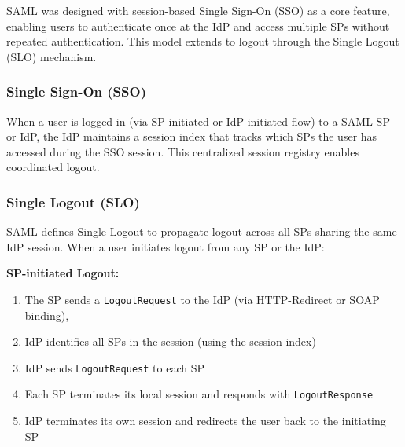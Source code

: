 \documentclass[../memoire.tex]{subfiles}
\begin{document}

SAML was designed with session-based Single Sign-On (SSO) as a core feature, enabling users to authenticate once at the IdP and access multiple SPs without repeated authentication. This model extends to logout through the Single Logout (SLO) mechanism.

\subsubsection*{Single Sign-On (SSO)}

When a user is logged in (via SP-initiated or IdP-initiated flow) to a SAML SP or IdP, the IdP maintains a session index that tracks which SPs the user has accessed during the SSO session. This centralized session registry enables coordinated logout.

\subsubsection*{Single Logout (SLO)}

SAML defines Single Logout to propagate logout across all SPs sharing the same IdP session. When a user initiates logout from any SP or the IdP:

\textbf{SP-initiated Logout:}
\begin{enumerate}
  \item The SP sends a \texttt{LogoutRequest} to the IdP (via HTTP-Redirect or SOAP binding),
  \item IdP identifies all SPs in the session (using the session index)
  \item IdP sends \texttt{LogoutRequest} to each SP
  \item Each SP terminates its local session and responds with \texttt{LogoutResponse}
  \item IdP terminates its own session and redirects the user back to the initiating SP
\end{enumerate}
\end{document}
